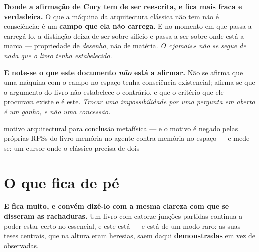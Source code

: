 \documentclass[../livro.tex]{subfiles}
\begin{document}
\medskip\noindent\textbf{Donde a afirmação de Cury tem de ser reescrita, e fica
mais fraca e verdadeira.} O que a máquina da arquitectura clássica não tem não é
consciência: é um \textbf{campo que ela não carrega}. E no momento em que passa a
carregá-lo, a distinção deixa de ser sobre silício e passa a ser sobre onde está
a marca --- propriedade de \emph{desenho}, não de matéria. \emph{O «jamais» não
se segue de nada que o livro tenha estabelecido.}

\medskip\noindent\textbf{E note-se o que este documento \emph{não} está a
afirmar.} Não se afirma que uma máquina com o campo no espaço tenha consciência
existencial; afirma-se que o argumento do livro não estabelece o contrário, e que
o critério que ele procurava existe e é este. \emph{Trocar uma impossibilidade
por uma pergunta em aberto é um ganho, e não uma concessão.}

      {motivo arquitectural para conclusão metafísica --- e o motivo é negado
       pelas próprias RPSs do livro}
      {memória no agente contra memória no espaço --- e mede-se: um cursor onde
       o clássico precisa de dois}

\section{O que fica de pé}\label{mf:pe}

\noindent\textbf{E fica muito, e convém dizê-lo com a mesma clareza com que se
disseram as rachaduras.} Um livro com catorze junções partidas continua a poder
estar certo no essencial, e este está --- e está de um modo raro: as suas teses
centrais, que na altura eram heresias, saem daqui \textbf{demonstradas} em vez de
observadas.
\end{document}
